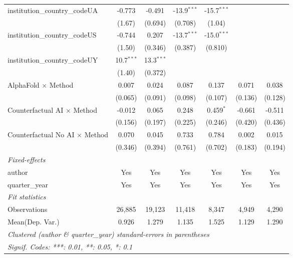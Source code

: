 \begin{tabular}{lcccccc}
   institution\_country\_codeUA          & -0.773        & -0.491        & -13.9$^{***}$ & -15.7$^{***}$ &               &   \\   
                                         & (1.67)        & (0.694)       & (0.708)       & (1.04)        &               &   \\   
   institution\_country\_codeUS          & -0.744        & 0.207         & -13.7$^{***}$ & -15.0$^{***}$ &               &   \\   
                                         & (1.50)        & (0.346)       & (0.387)       & (0.810)       &               &   \\   
   institution\_country\_codeUY          & 10.7$^{***}$  & 13.3$^{***}$  &               &               &               &   \\   
                                         & (1.40)        & (0.372)       &               &               &               &   \\   
   AlphaFold $\times$ Method             & 0.007         & 0.024         & 0.087         & 0.137         & 0.071         & 0.038\\   
                                         & (0.065)       & (0.091)       & (0.098)       & (0.107)       & (0.136)       & (0.128)\\   
   Counterfactual AI $\times$ Method     & -0.012        & 0.065         & 0.248         & 0.459$^{*}$   & -0.661        & -0.511\\   
                                         & (0.156)       & (0.197)       & (0.225)       & (0.246)       & (0.420)       & (0.436)\\   
   Counterfactual No AI $\times$ Method  & 0.070         & 0.045         & 0.733         & 0.784         & 0.002         & 0.015\\   
                                         & (0.346)       & (0.394)       & (0.761)       & (0.702)       & (0.183)       & (0.194)\\   
   \midrule
   \emph{Fixed-effects}\\
   author                                & Yes           & Yes           & Yes           & Yes           & Yes           & Yes\\  
   quarter\_year                         & Yes           & Yes           & Yes           & Yes           & Yes           & Yes\\  
   \midrule
   \emph{Fit statistics}\\
   Observations                          & 26,885        & 19,123        & 11,418        & 8,347         & 4,949         & 4,290\\  
Mean(Dep. Var.) & 0.926 & 1.279 & 1.135 & 1.525 & 1.129 & 1.290 \\
   \midrule \midrule
   \multicolumn{7}{l}{\emph{Clustered (author \& quarter\_year) standard-errors in parentheses}}\\
   \multicolumn{7}{l}{\emph{Signif. Codes: ***: 0.01, **: 0.05, *: 0.1}}\\
\end{tabular}
\par\endgroup
